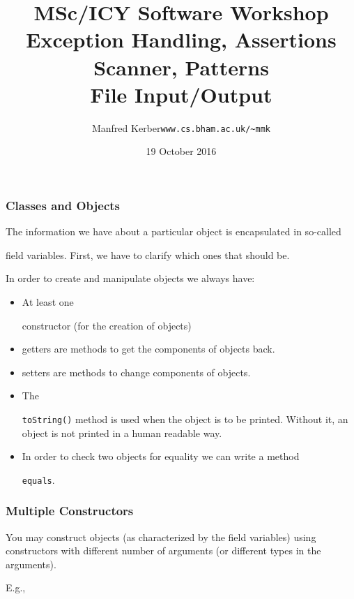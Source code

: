 \documentclass{beamer}
\def\mytoday{19 October 2016}
\def\mcolor#1#2{\rule{0ex}{0ex}\color{#1}#2\color{black}{}}
\begin{document}
\title{MSc/ICY Software Workshop\\
Exception Handling, Assertions\\Scanner, Patterns\\File Input/Output}

\author[Manfred~Kerber]{\begin{tabular}{ll}
\mcolor{blue}{Manfred Kerber} &   {\tt www.cs.bham.ac.uk/\~{}mmk}\\
\end{tabular}}

\date{\mytoday}

\begin{frame}
\titlepage
\end{frame}

\begin{frame}
\frametitle{Classes and Objects}

The information we have about a particular object is encapsulated in
so-called \mcolor{blue}{field variables}. First, we have to clarify
which ones that should be.

In order to create and manipulate objects we always have:


\begin{itemize}
\item At least one \mcolor{blue}{constructor} (for the creation of objects)
\item \mcolor{blue}{getter}s are methods to get the components of objects back.
\item \mcolor{blue}{setter}s are methods to change components of objects.
\item The \mcolor{blue}{\texttt{toString()}} method is used when the object is to be printed. Without it, an object is not printed in a human readable way.
\item In order to check two objects for equality we can write a method 
\mcolor{blue}{\texttt{equals}}.
\end{itemize}

\end{frame}

\begin{frame}
\frametitle{Multiple Constructors}

You may construct objects (as characterized by the field variables) using constructors with different number of arguments (or different types in the arguments).

E.g.,


\end{frame}
\end{document}
